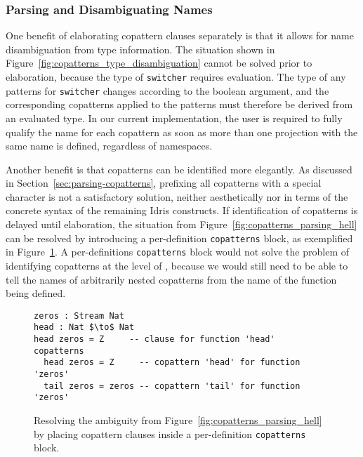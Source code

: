 \subsubsection{Parsing and Disambiguating Names}
One benefit of elaborating copattern clauses separately is that it
allows for name disambiguation from type information. The situation shown in
Figure~\ref{fig:copatterns_type_disambiguation} cannot be solved prior to
elaboration, because the type of \texttt{switcher} requires evaluation. The type
of any patterns for \texttt{switcher} changes according to the boolean argument,
and the corresponding copatterns applied to the patterns must therefore be
derived from an evaluated type. In our current implementation, the user is required to fully
qualify the name for each copattern as soon as more than one projection with the
same name is defined, regardless of namespaces.

Another benefit is that copatterns can be identified more
elegantly. As discussed in Section~\ref{sec:parsing-copatterns}, prefixing all
copatterns with a special character is not a satisfactory solution, neither
aesthetically nor in terms of the concrete syntax of the remaining Idris
constructs. If identification of copatterns is delayed until elaboration, the
situation from Figure~\ref{fig:copatterns_parsing_hell} can be resolved by
introducing a per-definition \texttt{copatterns} block, as exemplified in
Figure~\ref{fig:copatterns_parsing_hell_fixed_copatterns_block}. A
per-definitions \texttt{copatterns} block would not solve the problem of
identifying copatterns at the level of \IdrisM{}, because we would still need to be able to
tell the names of arbitrarily nested copatterns from the name of the function being
defined.



\begin{figure}
\begin{lstlisting}[mathescape]
zeros : Stream Nat
head : Nat $\to$ Nat
head zeros = Z     -- clause for function 'head'
copatterns
  head zeros = Z     -- copattern 'head' for function 'zeros'
  tail zeros = zeros -- copattern 'tail' for function 'zeros'
\end{lstlisting}
  \caption{Resolving the ambiguity from Figure~\ref{fig:copatterns_parsing_hell}
  by placing copattern clauses inside a per-definition \texttt{copatterns} block.}
  \label{fig:copatterns_parsing_hell_fixed_copatterns_block}
\end{figure}

